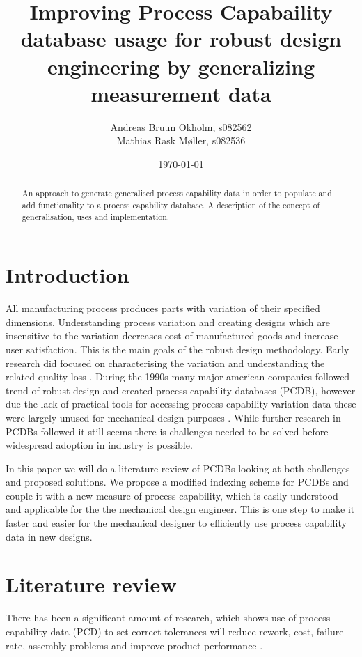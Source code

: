 \documentclass[aip,amsmath, preprint, author-year]{revtex4-1}
\begin{document}
\begin{abstract}
An approach to generate generalised process capability data in order to populate and add functionality to a process capability database.
A description of the concept of generalisation, uses and implementation.
\end{abstract}

\title{Improving Process Capabaility database usage for robust design engineering by generalizing measurement data}
\author{Andreas Bruun Okholm, s082562\\
Mathias Rask Møller, s082536 }
 
\date{\today}
\maketitle


\section{Introduction}

All manufacturing process produces parts with variation of their specified dimensions.  
Understanding process variation and creating designs which are insensitive to the variation decreases cost of manufactured goods and increase user satisfaction. 
This is the main goals of the robust design methodology. 
Early research did focused on characterising the variation and understanding the related quality loss \cite{taguchi1986introduction}. 
During the 1990s many major american companies followed trend of robust design and created process capability databases (PCDB), however due the lack of practical tools for accessing process capability variation data these were largely unused for mechanical design purposes \cite{tata1999process}. 
While further research in PCDBs followed it still seems there is challenges needed to be solved before widespread adoption in industry is possible. 

In this paper we will do a literature review of PCDBs looking at both challenges and proposed solutions. 
We propose a modified indexing scheme for PCDBs and couple it with a new measure of process capability, which is easily understood and applicable for the the mechanical design engineer. 
This is one step to make it faster and easier for the mechanical designer to efficiently use process capability data in new designs. 

\section{Literature review}
There has been a significant amount of research, which shows use of process capability data (PCD) to set correct tolerances will reduce rework, cost, failure rate, assembly problems and improve product performance \citep{tata1999process}.
\end{document}
